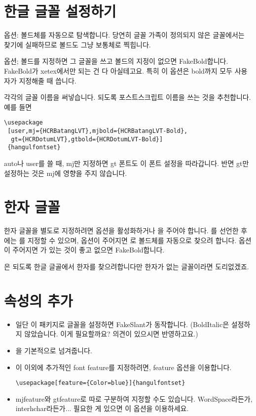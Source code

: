 \documentclass[b5paper,nanum]{oblivoir}
\begin{document}
\section{한글 글꼴 설정하기}

\begin{description} \tightlist
\item [auto] 옵션: 볼드체를 자동으로 탐색합니다. 당연히 글꼴 가족이 정의되지 않은 글꼴에서는 찾기에 실패하므로 볼드도 그냥 보통체로 찍힙니다.
\item [user] 옵션; 볼드를 지정하면 그 글꼴을 쓰고 볼드의 지정이 없으면 FakeBold합니다. FakeBold가 xetex에서만 되는 건 다 아실테고요. 특히 이 옵션은 bold까지 모두 사용자가 지정해줄 때 씁니다.
\item [mj, mjbold, gt, gtbold] 각각의 글꼴 이름을 써넣습니다. 되도록 포스트스크립트 이름을 쓰는 것을 추천합니다. 예를 들면
\begin{verbatim}
\usepackage
 [user,mj={HCRBatangLVT},mjbold={HCRBatangLVT-Bold},
  gt={HCRDotumLVT},gtbold={HCRDotumLVT-Bold}]
 {hangulfontset}
\end{verbatim}
\end{description}
auto나 user를 쓸 때, mj만 지정하면 gt 폰트도 이 폰트 설정을 따라갑니다. 반면 gt만 설정하는 것은 mj에 영향을 주지 않습니다.

\section{한자 글꼴}

한자 글꼴을 별도로 지정하려면 \ct{[hanja]} 옵션을 활성화하거나 \ct{[hanjabyhangul]}을 주어야 합니다.
\ct{[hanja]}를 선언한 후에는 를 지정할 수 있으며,  옵션이 주어지면 로 볼드체를 자동으로 찾으려 합니다.  옵션이 주어지면 가 있는 것이 좋고 없으면 FakeBold합니다.

\ct{[hanjabyhangul]}은 되도록 한글 글골에서 한자를 찾으려합니다만 한자가 없는 글꼴이라면 도리없겠죠.

\section{속성의 추가}

\begin{itemize}\tightlist
\item 일단 이 패키지로 글꼴을 설정하면 FakeSlant가 동작합니다. (BoldItalic은 설정하지 않았습니다. 이게 필요할까요? 의견이 있으시면 반영하고요.)

\item {}을 기본적으로 넘겨줍니다.

\item 이 이외에 추가적인 font feature를 지정하려면, feature 옵션을 이용합니다.
\begin{verbatim}
\usepackage[feature={Color=blue}]{hangulfontset}
\end{verbatim}

\item mjfeature와 gtfeature로 따로 구분하여 지정할 수도 있습니다. WordSpace라든가, interhchar라든가... 필요한 게 있으면 이 옵션을 이용하세요.
\end{itemize}
\end{document}
